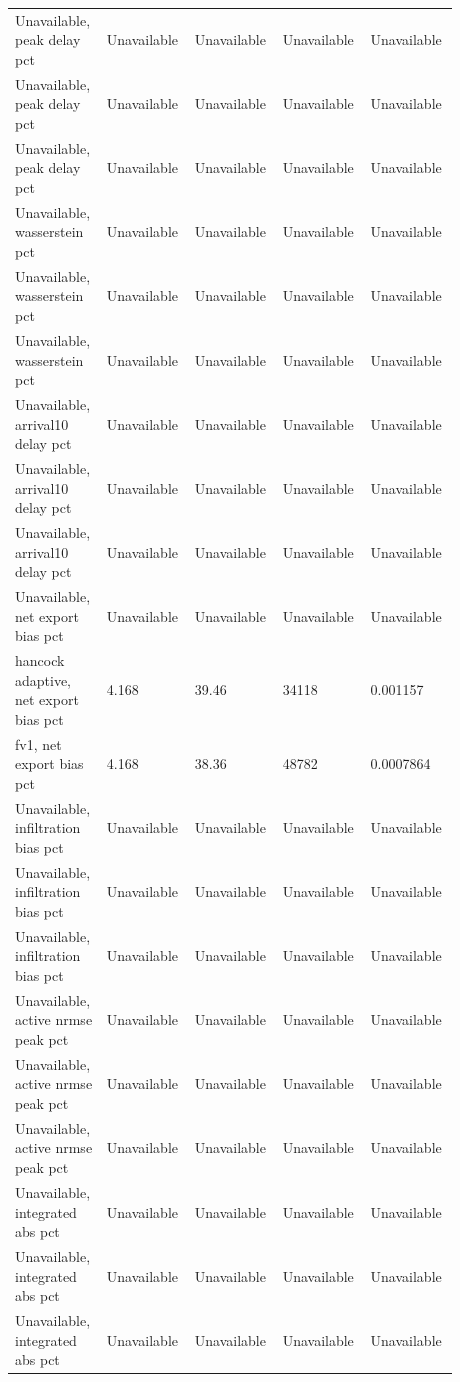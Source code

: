 \begin{longtable}{p{0.1760\linewidth}p{0.1760\linewidth}p{0.1760\linewidth}p{0.1760\linewidth}p{0.1760\linewidth}}
Unavailable, peak delay pct & Unavailable & Unavailable & Unavailable & Unavailable \\
Unavailable, peak delay pct & Unavailable & Unavailable & Unavailable & Unavailable \\
Unavailable, peak delay pct & Unavailable & Unavailable & Unavailable & Unavailable \\
Unavailable, wasserstein pct & Unavailable & Unavailable & Unavailable & Unavailable \\
Unavailable, wasserstein pct & Unavailable & Unavailable & Unavailable & Unavailable \\
Unavailable, wasserstein pct & Unavailable & Unavailable & Unavailable & Unavailable \\
Unavailable, arrival10 delay pct & Unavailable & Unavailable & Unavailable & Unavailable \\
Unavailable, arrival10 delay pct & Unavailable & Unavailable & Unavailable & Unavailable \\
Unavailable, arrival10 delay pct & Unavailable & Unavailable & Unavailable & Unavailable \\
Unavailable, net export bias pct & Unavailable & Unavailable & Unavailable & Unavailable \\
hancock adaptive, net export bias pct & 4.168 & 39.46 & 34118 & 0.001157 \\
fv1, net export bias pct & 4.168 & 38.36 & 48782 & 0.0007864 \\
Unavailable, infiltration bias pct & Unavailable & Unavailable & Unavailable & Unavailable \\
Unavailable, infiltration bias pct & Unavailable & Unavailable & Unavailable & Unavailable \\
Unavailable, infiltration bias pct & Unavailable & Unavailable & Unavailable & Unavailable \\
Unavailable, active nrmse peak pct & Unavailable & Unavailable & Unavailable & Unavailable \\
Unavailable, active nrmse peak pct & Unavailable & Unavailable & Unavailable & Unavailable \\
Unavailable, active nrmse peak pct & Unavailable & Unavailable & Unavailable & Unavailable \\
Unavailable, integrated abs pct & Unavailable & Unavailable & Unavailable & Unavailable \\
Unavailable, integrated abs pct & Unavailable & Unavailable & Unavailable & Unavailable \\
Unavailable, integrated abs pct & Unavailable & Unavailable & Unavailable & Unavailable \\

\end{longtable}
